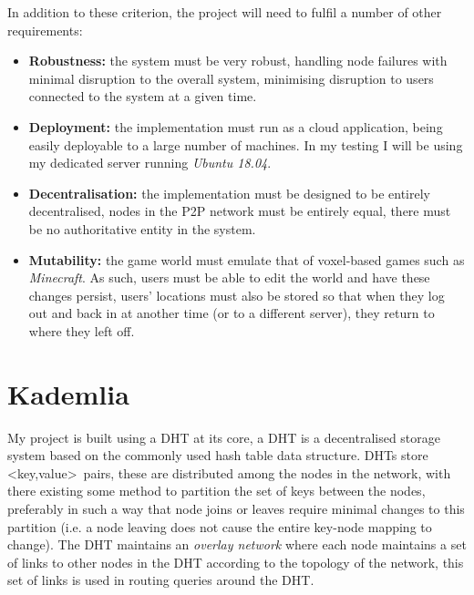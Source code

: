 \documentclass[10pt,twoside,notitlepage,a4paper]{report}
\begin{document}
	In addition to these criterion, the project will need to fulfil a number of other requirements:
	
	\begin{itemize}
		\item \textbf{Robustness:} the system must be very robust, handling node failures with minimal disruption to the overall system, minimising disruption to users connected to the system at a given time.
		\item \textbf{Deployment:} the implementation must run as a cloud application, being easily deployable to a large number of machines. In my testing I will be using my dedicated server running \emph{Ubuntu 18.04}.
		\item \textbf{Decentralisation:} the implementation must be designed to be entirely decentralised, nodes in the P2P network must be entirely equal, there must be no authoritative entity in the system.
		\item \textbf{Mutability:} the game world must emulate that of voxel-based games such as \emph{Minecraft}. As such, users must be able to edit the world and have these changes persist, users' locations must also be stored so that when they log out and back in at another time (or to a different server), they return to where they left off.
	\end{itemize}

	\section{Kademlia}
	My project is built using a DHT at its core, a DHT is a decentralised storage system based on the commonly used hash table data structure. DHTs store \textless key,value\textgreater~pairs, these are distributed among the nodes in the network, with there existing some method to partition the set of keys between the nodes, preferably in such a way that node joins or leaves require minimal changes to this partition (i.e. a node leaving does not cause the entire key-node mapping to change). The DHT maintains an \emph{overlay network} where each node maintains a set of links to other nodes in the DHT according to the topology of the network, this set of links is used in routing queries around the DHT.
	
\end{document}
